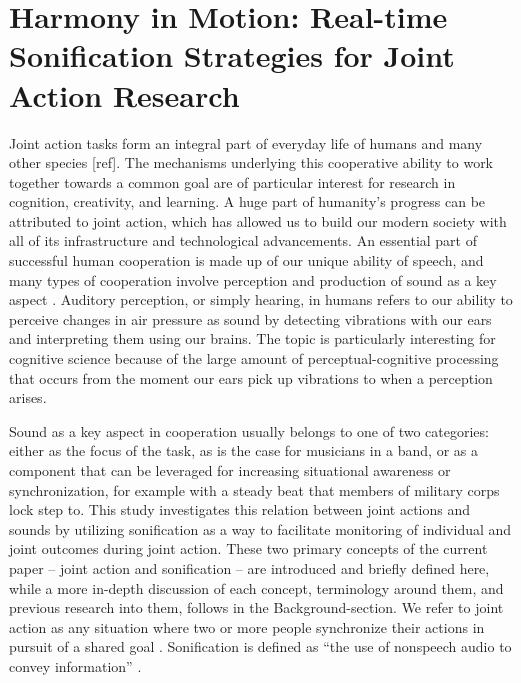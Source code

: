 \documentclass[10pt,a4paper,onecolumn]{article}
\begin{document}
\restoregeometry
\twocolumn
{
\hypersetup{linkcolor=Black}
\setcounter{tocdepth}{3}
\tableofcontents
}
\clearpage
\hypertarget{harmony-in-motion-real-time-sonification-strategies-for-joint-action-research}{%
\section{Harmony in Motion: Real-time Sonification Strategies for Joint Action Research}\label{harmony-in-motion-real-time-sonification-strategies-for-joint-action-research}}

Joint action tasks form an integral part of everyday life of humans \autocite{vanderwelUnderstandingJointAction2021} and many other species {[}ref{]}. The mechanisms underlying this cooperative ability to work together towards a common goal are of particular interest for research in cognition, creativity, and learning. A huge part of humanity's progress can be attributed to joint action, which has allowed us to build our modern society with all of its infrastructure and technological advancements. An essential part of successful human cooperation is made up of our unique ability of speech, and many types of cooperation involve perception and production of sound as a key aspect . Auditory perception, or simply hearing, in humans refers to our ability to perceive changes in air pressure as sound by detecting vibrations with our ears and interpreting them using our brains. The topic is particularly interesting for cognitive science because of the large amount of perceptual-cognitive processing that occurs from the moment our ears pick up vibrations to when a perception arises.

Sound as a key aspect in cooperation usually belongs to one of two categories: either as the focus of the task, as is the case for musicians in a band, or as a component that can be leveraged for increasing situational awareness or synchronization, for example with a steady beat that members of military corps lock step to. This study investigates this relation between joint actions and sounds by utilizing sonification as a way to facilitate monitoring of individual and joint outcomes during joint action. These two primary concepts of the current paper -- joint action and sonification -- are introduced and briefly defined here, while a more in-depth discussion of each concept, terminology around them, and previous research into them, follows in the Background-section. We refer to joint action as any situation where two or more people synchronize their actions in pursuit of a shared goal \autocite{knoblichPsychologicalResearchJoint2011}. Sonification is defined as ``the use of nonspeech audio to convey information'' \autocite[p.~4]{kramerSonificationReportStatus1999}.
\end{document}
